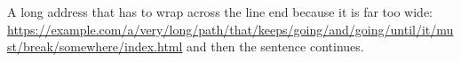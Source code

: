 \documentclass{article}
\begin{document}
A long address that has to wrap across the line end because it is far too wide:
\url{https://example.com/a/very/long/path/that/keeps/going/and/going/until/it/must/break/somewhere/index.html}
and then the sentence continues.
\end{document}
